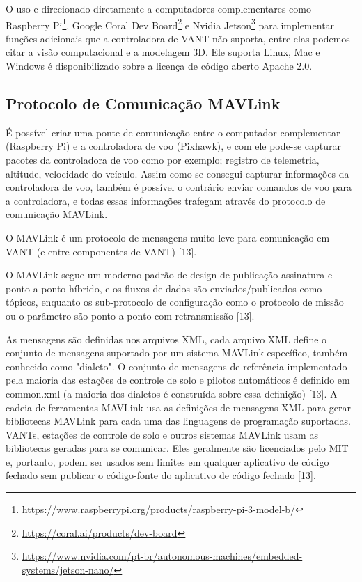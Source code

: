 O uso e direcionado diretamente a computadores complementares como Raspberry Pi\footnote{\url{https://www.raspberrypi.org/products/raspberry-pi-3-model-b/}}, Google Coral Dev Board\footnote{\url{https://coral.ai/products/dev-board}} e Nvidia Jetson\footnote{\url{https://www.nvidia.com/pt-br/autonomous-machines/embedded-systems/jetson-nano/}} para implementar funções adicionais que a controladora de VANT não suporta, entre elas podemos citar a visão computacional e a modelagem 3D. Ele suporta Linux, Mac e Windows é disponibilizado sobre a licença de código aberto Apache 2.0.

\subsection{Protocolo de Comunicação MAVLink}
É possível criar uma ponte de comunicação entre o computador complementar (Raspberry Pi) e a controladora de voo (Pixhawk), e com ele pode-se capturar pacotes da controladora de voo como por exemplo; registro de telemetria, altitude, velocidade do veículo.
Assim como se consegui capturar informações da controladora de voo, também é possível o contrário enviar comandos de voo para a controladora, e todas essas informações trafegam através do protocolo de comunicação MAVLink.

O MAVLink é um protocolo de mensagens muito leve para comunicação em VANT (e entre componentes de VANT) [13].

O MAVLink segue um moderno padrão de design de publicação-assinatura e ponto a ponto híbrido, e os fluxos de dados são enviados/publicados como tópicos, enquanto os sub-protocolo de configuração como o protocolo de missão ou o parâmetro são ponto a ponto com retransmissão [13].

As mensagens são definidas nos arquivos XML, cada arquivo XML define o conjunto de mensagens suportado por um sistema MAVLink específico, também conhecido como "dialeto". O conjunto de mensagens de referência implementado pela maioria das estações de controle de solo e pilotos automáticos é definido em common.xml (a maioria dos dialetos é construída sobre essa definição) [13].
A cadeia de ferramentas MAVLink usa as definições de mensagens XML para gerar bibliotecas MAVLink para cada uma das linguagens de programação suportadas. VANTs, estações de controle de solo e outros sistemas MAVLink usam as bibliotecas geradas para se comunicar. Eles geralmente são licenciados pelo MIT e, portanto, podem ser usados sem limites em qualquer aplicativo de código fechado sem publicar o código-fonte do aplicativo de código fechado [13].

